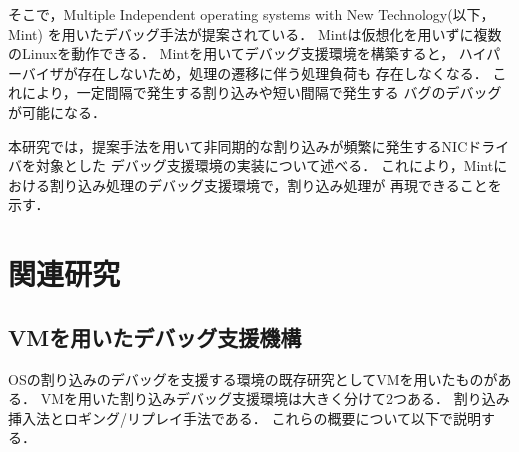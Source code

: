 \documentclass[submit,techreq,noauthor,dvipdfmx]{ipsj}
\begin{document}
そこで，Multiple Independent operating systems with New Technology(以下，Mint)\cite{senzaki}
を用いたデバッグ手法が提案されている．
Mintは仮想化を用いずに複数のLinuxを動作できる．
Mintを用いてデバッグ支援環境を構築すると，
ハイパーバイザが存在しないため，処理の遷移に伴う処理負荷も
存在しなくなる．
これにより，一定間隔で発生する割り込みや短い間隔で発生する
バグのデバッグが可能になる．

本研究では，提案手法を用いて非同期的な割り込みが頻繁に発生するNICドライバを対象とした
デバッグ支援環境の実装について述べる．
これにより，Mintにおける割り込み処理のデバッグ支援環境で，割り込み処理が
再現できることを示す．


\section{関連研究}\label{chap:related_reserch}

\subsection{VMを用いたデバッグ支援機構}\label{sec:debugging_support_mechanism_with_VM}

OSの割り込みのデバッグを支援する環境の既存研究としてVMを用いたものがある．
VMを用いた割り込みデバッグ支援環境は大きく分けて2つある．
割り込み挿入法\cite{miyahara}とロギング/リプレイ手法\cite{samuel}\cite{jim}\cite{kawasaki}である．
これらの概要について以下で説明する．
\end{document}
